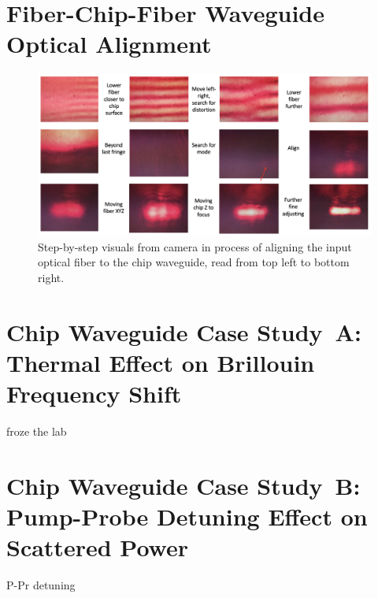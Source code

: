 \section{Fiber-Chip-Fiber Waveguide Optical Alignment}
\label{Raman:Appendix:sec:WaveguideAlignment}

\begin{figure}[t]
  \centering
  \includegraphics[width=\textwidth]{figs/4-Raman/WaveguideAlignmentCameraFringePattern.png}
  \caption{Step-by-step visuals from camera in process of aligning the input optical fiber to the chip waveguide, read from top left to bottom right.}
  \label{fig:Raman:WaveguideAlignmentCameraFringePattern}
\end{figure}

\section{Chip Waveguide Case Study~A: Thermal Effect on Brillouin Frequency Shift}
\label{Raman:Appendix:sec:CaseStudyAThermal}

froze the lab

\section{Chip Waveguide Case Study~B: Pump-Probe Detuning Effect on Scattered Power}
\label{Raman:Appendix:sec:CaseStudyBDetuning}

P-Pr detuning
